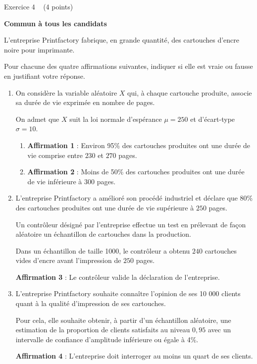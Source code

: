 
%
\begin{h2}Exercice 4   (4 points)\end{h2}
\textbf{Commun  à tous les candidats}
\par
L'entreprise Printfactory fabrique, en grande quantité, des cartouches d'encre noire pour imprimante.
\par
Pour chacune des quatre affirmations suivantes, indiquer si elle est vraie ou fausse en justifiant votre réponse.
\begin{enumerate}
     \item
     On considère la variable aléatoire $X$ qui, à chaque cartouche produite, associe sa durée de vie exprimée en nombre de pages.
     \par
     On admet que $X$ suit la loi normale d'espérance $\mu =250$ et d'écart-type $\sigma =10$.
     \begin{enumerate}
          \item
          \textbf{Affirmation 1} : Environ 95\% des cartouches produites ont une durée de vie comprise entre $230$ et $270$ pages.
          \item
     \textbf{Affirmation 2} : Moins de 50\% des cartouches produites ont une durée de vie inférieure à $300$ pages.\end{enumerate}
     \item
     L'entreprise Printfactory a amélioré son procédé industriel et déclare que 80\% des cartouches produites ont une durée de vie supérieure à $250$  pages.
     \par
     Un contrôleur désigné par l'entreprise effectue un test en prélevant de façon aléatoire un échantillon de cartouches dans la production.
     \par
     Dans un échantillon de taille 1000, le contrôleur a obtenu $240$ cartouches vides d'encre avant l'impression de $250$ pages.
\par
     \textbf{Affirmation 3} : Le contrôleur valide la déclaration de l'entreprise.
     \item
     L'entreprise Printfactory souhaite connaître l'opinion de ses 10 000 clients quant à la qualité d'impression de ses cartouches.
     \par
     Pour cela, elle souhaite obtenir, à partir d'un échantillon aléatoire, une estimation de la proportion de clients satisfaits au niveau $0,95$ avec un intervalle de confiance d'amplitude inférieure ou égale à 4\%.
\par
\textbf{Affirmation 4} : L'entreprise doit interroger au moins un quart de ses clients.\end{enumerate}
